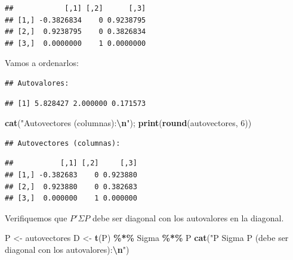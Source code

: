 \documentclass[
]{book}
\newenvironment{Shaded}{\begin{snugshade}}{\end{snugshade}}
\newcommand{\DecValTok}[1]{\textcolor[rgb]{0.00,0.00,0.81}{#1}}
\newcommand{\FunctionTok}[1]{\textcolor[rgb]{0.13,0.29,0.53}{\textbf{#1}}}
\newcommand{\NormalTok}[1]{#1}
\newcommand{\OtherTok}[1]{\textcolor[rgb]{0.56,0.35,0.01}{#1}}
\newcommand{\SpecialCharTok}[1]{\textcolor[rgb]{0.81,0.36,0.00}{\textbf{#1}}}
\newcommand{\StringTok}[1]{\textcolor[rgb]{0.31,0.60,0.02}{#1}}
\begin{document}
\begin{verbatim}
##            [,1] [,2]      [,3]
## [1,] -0.3826834    0 0.9238795
## [2,]  0.9238795    0 0.3826834
## [3,]  0.0000000    1 0.0000000
\end{verbatim}

Vamos a ordenarlos:

\begin{Shaded}
\end{Shaded}

\begin{verbatim}
## Autovalores:
\end{verbatim}

\begin{verbatim}
## [1] 5.828427 2.000000 0.171573
\end{verbatim}

\begin{Shaded}
\begin{Highlighting}[]
\FunctionTok{cat}\NormalTok{(}\StringTok{"Autovectores (columnas):}\SpecialCharTok{\textbackslash{}n}\StringTok{"}\NormalTok{); }\FunctionTok{print}\NormalTok{(}\FunctionTok{round}\NormalTok{(autovectores, }\DecValTok{6}\NormalTok{))}
\end{Highlighting}
\end{Shaded}

\begin{verbatim}
## Autovectores (columnas):
\end{verbatim}

\begin{verbatim}
##           [,1] [,2]     [,3]
## [1,] -0.382683    0 0.923880
## [2,]  0.923880    0 0.382683
## [3,]  0.000000    1 0.000000
\end{verbatim}

Verifiquemos que \(P' \Sigma P\) debe ser diagonal con los autovalores en la diagonal.

\begin{Shaded}
\begin{Highlighting}[]
\NormalTok{P }\OtherTok{\textless{}{-}}\NormalTok{ autovectores}
\NormalTok{D }\OtherTok{\textless{}{-}} \FunctionTok{t}\NormalTok{(P) }\SpecialCharTok{\%*\%}\NormalTok{ Sigma }\SpecialCharTok{\%*\%}\NormalTok{ P}
\FunctionTok{cat}\NormalTok{(}\StringTok{"P\textquotesingle{} Sigma P (debe ser diagonal con los autovalores):}\SpecialCharTok{\textbackslash{}n}\StringTok{"}\NormalTok{)}
\end{Highlighting}
\end{Shaded}
\end{document}
